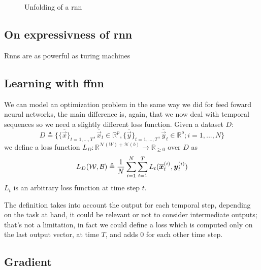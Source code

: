 \begin{figure}[h!]
\caption{Unfolding of a rnn}
\label{rnn_unfolding}
\end{figure}



\subsection{On expressivness of rnn}
Rnns are as powerful as turing machines
\subsection{Learning with ffnn}
We can model an optimization problem in the same way we did for feed foward neural networks, the main difference is, again, that we now deal with temporal sequences so we need a slightly different
loss function.
Given a dataset $D$:
\begin{equation}
D\triangleq\{\{\overline{\vec{x}}\}_{t=1,...,T}, \overline{\vec{x}}_t \in \mathbb{R}^p, \{\overline{\vec{y}}\}_{t=1,...,T}, \overline{\vec{y}}_t \in \mathbb{R}^o;  i=1,...,N\}
\end{equation}
we define a loss function $L_D:\mathbb{R}^{\mathcal{N}(W)+\mathcal{N}(b)} \rightarrow \mathbb{R}_{\geq 0}$ over $D$  as
\begin{equation}
L_D(\mathcal{W},\mathcal{B})\triangleq\frac{1}{N}\sum_{i=1}^N \sum_{t=1}^T L_t(\overline{\boldsymbol{x}}_t^{(i)},\boldsymbol{y}_t^{(i)}) 
\end{equation}
$L_t$ is an arbitrary loss function at time step $t$.

The definition takes into account the output for each temporal step, depending on the task at hand, it could be relevant or not to consider intermediate
outputs; that's not a limitation, in fact we could define a loss which is computed only on the last output vector, at time $T$, and adds 0 for each
other time step.


\subsection{Gradient}




